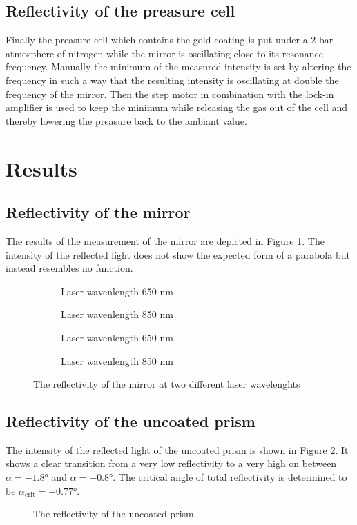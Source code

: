 \documentclass[twoside,english,headsepline=on,DIV=12]{scrartcl}
\numberwithin{equation}{section}
\begin{document}
\subsection{Reflectivity of the preasure cell}
Finally the preasure cell which contains the gold coating is put under a 2 bar atmosphere of nitrogen while the mirror is oscillating close to its resonance frequency. Manually the minimum of the measured intensity is set by altering the frequency in such a way that the resulting intensity is oscillating at double the frequency of the mirror. Then the step motor in combination with the lock-in amplifier is used to keep the minimum while releasing the gas out of the cell and thereby lowering the preasure back to the ambiant value. 

\section{Results}
\subsection{Reflectivity of the mirror}
The results of the measurement of the mirror are depicted in Figure \ref{fig:mirror}. The intensity of the reflected light does not show the expected form of a parabola but instead resembles no function. 
\begin{figure}
	\begin{subfigure}{.48\textwidth}
		
		\caption{Laser wavenlength 650 nm}
	\end{subfigure}
	\begin{subfigure}{.48\textwidth}
		
		\caption{Laser wavenlength 850 nm}
	\end{subfigure}
	\begin{subfigure}{.48\textwidth}
		
		\caption{Laser wavenlength 650 nm}
	\end{subfigure}
	\begin{subfigure}{.48\textwidth}
		
		\caption{Laser wavenlength 850 nm}
	\end{subfigure}
	\caption{The reflectivity of the mirror at two different laser wavelenghts}
	\label{fig:mirror}
\end{figure}
\subsection{Reflectivity of the uncoated prism}
The intensity of the reflected light of the uncoated prism is shown in Figure \ref{fig:uncoated}. It shows a clear transition from a very low reflectivity to a very high on between $\alpha = -1.8°$ and $\alpha = -0.8°$. The critical angle of total reflectivity is determined to be $\alpha_\text{crit} = -0.77°$.
\begin{figure}
	
	\caption{The reflectivity of the uncoated prism}
	\label{fig:uncoated}
\end{figure}
\end{document}
